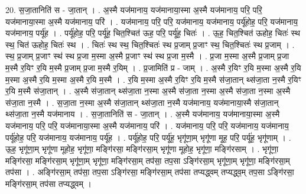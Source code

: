 \documentclass[17pt]{extarticle}
\begin{document}
20. स॒जा॒तानिति॑ स - जा॒तान् । . अ॒स्मै यज॑मानाय॒ यज॑मानाया॒स्मा अ॒स्मै यज॑मानाय॒ परि॒ परि॒ यज॑मानाया॒स्मा अ॒स्मै यज॑मानाय॒ परि॑ । . यज॑मानाय॒ परि॒ परि॒ यज॑मानाय॒ यज॑मानाय॒ पर्यू॑होह॒ परि॒ यज॑मानाय॒ यज॑मानाय॒ पर्यू॑ह । . पर्यू॑होह॒ परि॒ पर्यू॑ह॒ चित॒श्चित॑ ऊह॒ परि॒ पर्यू॑ह॒ चितः॑ । . ऊ॒ह॒ चित॒श्चित॑ ऊहोह॒ चितः॑ स्थ स्थ॒ चित॑ ऊहोह॒ चितः॑ स्थ । . चितः॑ स्थ स्थ॒ चित॒श्चितः॑ स्थ प्र॒जाम् प्र॒जाꣳ स्थ॒ चित॒श्चितः॑ स्थ प्र॒जाम् । . स्थ॒ प्र॒जाम् प्र॒जाꣳ स्थ॑ स्थ प्र॒जा म॒स्मा अ॒स्मै प्र॒जाꣳ स्थ॑ स्थ प्र॒जा म॒स्मै । . प्र॒जा म॒स्मा अ॒स्मै प्र॒जाम् प्र॒जा म॒स्मै र॒यिꣳ र॒यि म॒स्मै प्र॒जाम् प्र॒जा म॒स्मै र॒यिम् । . प्र॒जामिति॑ प्र - जाम् । . अ॒स्मै र॒यिꣳ र॒यि म॒स्मा अ॒स्मै र॒यि म॒स्मा अ॒स्मै र॒यि म॒स्मा अ॒स्मै र॒यि म॒स्मै । . र॒यि म॒स्मा अ॒स्मै र॒यिꣳ र॒यि म॒स्मै स॑जा॒तान् थ्स॑जा॒ता न॒स्मै र॒यिꣳ र॒यि म॒स्मै स॑जा॒तान् । . अ॒स्मै स॑जा॒तान् थ्स॑जा॒ता न॒स्मा अ॒स्मै स॑जा॒ता न॒स्मा अ॒स्मै स॑जा॒ता न॒स्मा अ॒स्मै स॑जा॒ता न॒स्मै । . स॒जा॒ता न॒स्मा अ॒स्मै स॑जा॒तान् थ्स॑जा॒ता न॒स्मै यज॑मानाय॒ यज॑मानाया॒स्मै स॑जा॒तान् थ्स॑जा॒ता न॒स्मै यज॑मानाय । . स॒जा॒तानिति॑ स - जा॒तान् । . अ॒स्मै यज॑मानाय॒ यज॑मानाया॒स्मा अ॒स्मै यज॑मानाय॒ परि॒ परि॒ यज॑मानाया॒स्मा अ॒स्मै यज॑मानाय॒ परि॑ । . यज॑मानाय॒ परि॒ परि॒ यज॑मानाय॒ यज॑मानाय॒ पर्यू॑होह॒ परि॒ यज॑मानाय॒ यज॑मानाय॒ पर्यू॑ह । . पर्यू॑होह॒ परि॒ पर्यू॑ह॒ भृगू॑णा॒म् भृगू॑णा मूह॒ परि॒ पर्यू॑ह॒ भृगू॑णाम् । . ऊ॒ह॒ भृगू॑णा॒म् भृगू॑णा मूहोह॒ भृगू॑णा॒ मङ्गि॑रसा॒ मङ्गि॑रसा॒म् भृगू॑णा मूहोह॒ भृगू॑णा॒ मङ्गि॑रसाम् । . भृगू॑णा॒ मङ्गि॑रसा॒ मङ्गि॑रसा॒म् भृगू॑णा॒म् भृगू॑णा॒ मङ्गि॑रसा॒म् तप॑सा॒ तप॒सा ऽङ्गि॑रसा॒म् भृगू॑णा॒म् भृगू॑णा॒ मङ्गि॑रसा॒म् तप॑सा । . अङ्गि॑रसा॒म् तप॑सा॒ तप॒सा ऽङ्गि॑रसा॒ मङ्गि॑रसा॒म् तप॑सा तप्यद्ध्वम् तप्यद्ध्व॒म् तप॒सा ऽङ्गि॑रसा॒ मङ्गि॑रसा॒म् तप॑सा तप्यद्ध्वम् । \newline
\end{document}
